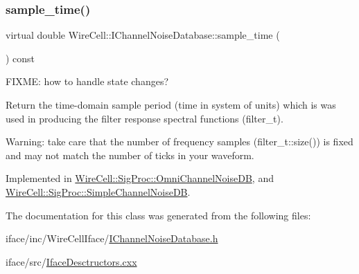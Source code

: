 \subsubsection{\texorpdfstring{sample\+\_\+time()}{sample\_time()}}
{\footnotesize\ttfamily virtual double Wire\+Cell\+::\+I\+Channel\+Noise\+Database\+::sample\+\_\+time (\begin{DoxyParamCaption}{ }\end{DoxyParamCaption}) const\hspace{0.3cm}{\ttfamily [pure virtual]}}



F\+I\+X\+ME\+: how to handle state changes? 

Return the time-\/domain sample period (time in system of units) which is was used in producing the filter response spectral functions (filter\+\_\+t).

Warning\+: take care that the number of frequency samples (filter\+\_\+t\+::size()) is fixed and may not match the number of ticks in your waveform. 

Implemented in \hyperlink{class_wire_cell_1_1_sig_proc_1_1_omni_channel_noise_d_b_a33769e729aab08e5320647cd4c04304c}{Wire\+Cell\+::\+Sig\+Proc\+::\+Omni\+Channel\+Noise\+DB}, and \hyperlink{class_wire_cell_1_1_sig_proc_1_1_simple_channel_noise_d_b_ac4ef81b15ca1bf55585bd89a092b8693}{Wire\+Cell\+::\+Sig\+Proc\+::\+Simple\+Channel\+Noise\+DB}.



The documentation for this class was generated from the following files\+:\begin{DoxyCompactItemize}
\item 
iface/inc/\+Wire\+Cell\+Iface/\hyperlink{_i_channel_noise_database_8h}{I\+Channel\+Noise\+Database.\+h}\item 
iface/src/\hyperlink{_iface_desctructors_8cxx}{Iface\+Desctructors.\+cxx}\end{DoxyCompactItemize}
